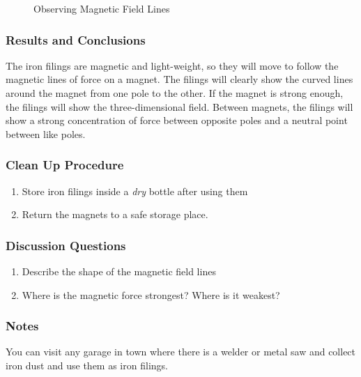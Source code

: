 \begin{figure}
\begin{center}
\def\svgwidth{150pt}

\caption{Observing Magnetic Field Lines}
\label{fig:magnetic-fields}
\end{center}
\end{figure}

\subsubsection*{Results and Conclusions}
The iron filings are magnetic and light-weight, so they will move to follow the magnetic lines of force on a magnet.  The filings will clearly show the curved lines around the magnet from one pole to the other.  If the magnet is strong enough, the filings will show the three-dimensional field.
Between magnets, the filings will show a strong concentration of force between opposite poles and a neutral point between like poles.

\subsubsection*{Clean Up Procedure}
\begin{enumerate}
\item{Store iron filings inside a \textit{dry} bottle after using them}
\item{Return the magnets to a safe storage place.}
\end{enumerate}

\subsubsection*{Discussion Questions}
\begin{enumerate}
\item{Describe the shape of the magnetic field lines}
\item{Where is the magnetic force strongest?  Where is it weakest?}
\end{enumerate}

\subsubsection*{Notes}
You can visit any garage in town where there is a welder or metal saw and collect iron dust and use them as iron filings.



